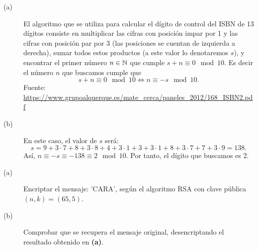 \documentclass{article}
\begin{document}
\begin{sol}
\begin{description}
\item[(a)] El algoritmo que se utiliza para calcular el dígito de control del ISBN de 13 dígitos consiste en multiplicar las cifras con posición impar por 1 y las cifras con posición par por 3 (las posiciones se cuentan de izquierda a derecha), sumar todos estos productos (a este valor lo denotaremos $\displaystyle s $), y encontrar el primer número $\displaystyle n  \in \mathbb{N}$ que cumple $\displaystyle s + n \equiv 0 \mod 10 $. Es decir el número $\displaystyle n $  que buscamos cumple que
	\[s + n \equiv 0 \mod 10 \iff n \equiv - s \mod 10 .\]
	Fuente: \url{https://www.grupoalquerque.es/mate_cerca/paneles_2012/168_ISBN2.pdf}	
\item[(b)] En este caso, el valor de $\displaystyle s $ será:
	\[s = 9 + 3 \cdot 7 + 8 + 3 \cdot 8 + 4 + 3 \cdot 1 + 3 + 3 \cdot 1 + 8 + 3 \cdot 7 + 7 + 3 \cdot 9 = 138 .\]
Así, $\displaystyle n \equiv - s \equiv - 138 \equiv 2 \mod 10 $. Por tanto, el dígito que buscamos es 2.	
\end{description}
\end{sol}

\begin{ej}
\begin{description}
\item[(a)] Encriptar el mensaje: 'CARA', según el algoritmo RSA con clave pública $\displaystyle \left(n,k\right) = \left(65,5\right) $.
\item[(b)] Comprobar que se recupera el mensaje original, desencriptando el resultado obtenido en \textbf{(a)}. 
\end{description}
\end{ej}
\end{document}
